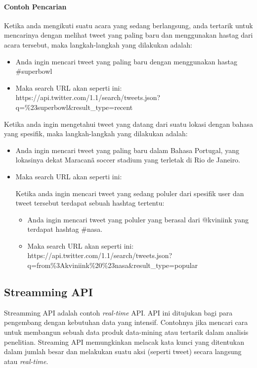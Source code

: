 \paragraph{Contoh Pencarian}
Ketika anda mengikuti suatu acara yang sedang berlangsung, anda tertarik untuk mencarinya dengan melihat tweet yang paling baru dan menggunakan hastag dari acara tersebut, maka langkah-langkah yang dilakukan adalah:
\begin{itemize}
	\item Anda ingin mencari tweet yang paling baru dengan menggunakan hastag \#superbowl
	\item Maka search URL akan seperti ini:
	https://api.twitter.com/1.1/search/tweets.json?q=\%23superbowl\&result\_type=recent
\end{itemize}

Ketika anda ingin mengetahui tweet yang datang dari suatu lokasi dengan bahasa yang spesifik, maka langkah-langkah yang dilakukan adalah:
\begin{itemize}
	\item Anda ingin mencari tweet yang paling baru dalam Bahasa Portugal, yang lokasinya dekat Maracanã soccer stadium yang terletak di Rio de Janeiro.
	\item Maka search URL akan seperti ini:
	
Ketika anda ingin mencari tweet yang sedang poluler dari spesifik user dan tweet tersebut terdapat sebuah hashtag tertentu:
\begin{itemize}
	\item Anda ingin mencari tweet yang poluler yang berasal dari @kviniink yang terdapat hashtag \#nasa.
	\item Maka search URL akan seperti ini:
	https://api.twitter.com/1.1/search/tweets.json?q=from\%3Akviniink\%20\%23nasa\&result\_type=popular
\end{itemize}
\end{itemize}

\subsection{Streamming API}
Streamming API adalah contoh \textit{real-time} API. API ini ditujukan bagi para pengembang dengan kebutuhan data yang intensif. Contohnya jika mencari cara untuk membangun sebuah data produk data-mining atau tertarik dalam analisis penelitian. Streaming API memungkinkan melacak kata kunci yang ditentukan dalam jumlah besar dan melakukan suatu aksi (seperti tweet) secara langsung atau \textit{real-time}.

